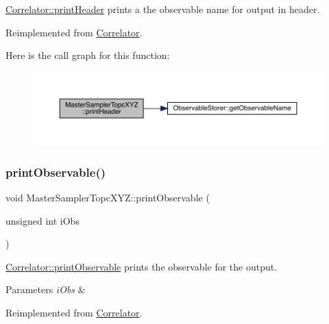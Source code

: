 \mbox{\hyperlink{class_correlator_ac7c5a07d7cbee97c417a1659b93083b2}{Correlator\+::print\+Header}} prints a the observable name for output in header. 



Reimplemented from \mbox{\hyperlink{class_correlator_ac7c5a07d7cbee97c417a1659b93083b2}{Correlator}}.

Here is the call graph for this function\+:
\nopagebreak
\begin{figure}[H]
\begin{center}
\leavevmode
\includegraphics[width=350pt]{class_master_sampler_topc_x_y_z_a630a504ecbf3ceb517ebeefb39c3faff_cgraph}
\end{center}
\end{figure}
\mbox{\label{class_master_sampler_topc_x_y_z_ab2312c9e9dc1e9deeb5bce36784372ac}} 
\subsubsection{\texorpdfstring{printObservable()}{printObservable()}}
{\footnotesize\ttfamily void Master\+Sampler\+Topc\+X\+Y\+Z\+::print\+Observable (\begin{DoxyParamCaption}\item[{unsigned int}]{i\+Obs }\end{DoxyParamCaption})\hspace{0.3cm}{\ttfamily [virtual]}}



\mbox{\hyperlink{class_correlator_a15744ddb9f2b71fff34ac762d101df38}{Correlator\+::print\+Observable}} prints the observable for the output. 


\begin{DoxyParams}{Parameters}
{\em i\+Obs} & \\
\hline
\end{DoxyParams}


Reimplemented from \mbox{\hyperlink{class_correlator_a15744ddb9f2b71fff34ac762d101df38}{Correlator}}.


